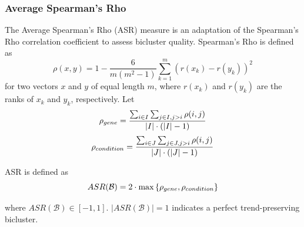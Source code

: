 \subsubsection*{Average Spearman's Rho}
The Average Spearman's Rho (ASR) \cite{ayadi2009biclustering} measure 
is an adaptation of the Spearman's Rho \cite{lehmann1975nonparametrics} correlation coefficient to assess bicluster quality. Spearman's Rho is defined as
\begin{equation}\label{spearman_rho}
	\rho(x, y) = 1 - \frac{6}{m(m^2-1)} \sum_{k=1}^{m} \left(r\left(x_k\right) - r\left(y_k\right)\right)^2
\end{equation}
for two vectors $x$ and $y$ of equal length $m$, where $r(x_k)$ and $r(y_k)$ are the ranks of $x_k$ and $y_k$, respectively. Let
\begin{equation}
	\rho_{\normalfont{gene}} = \frac{\sum_{i \in I} \sum_{j \in I, j > i} \rho(i, j)}{\lvert I \rvert \cdot \left(\lvert I \rvert - 1\right)}
\end{equation}
\begin{equation}
	\rho_{\normalfont{condition}} = \frac{\sum_{i \in J} \sum_{j \in J, j > i} \rho(i, j)}{\lvert J \rvert \cdot \left(\lvert J \rvert - 1\right)}
\end{equation}

\noindent ASR is defined as
\begin{equation} \label{asr}
	ASR(\mathcal{B}) = 2 \cdot \max\left\{\rho_{\normalfont{gene}}, \rho_{\normalfont{condition}}\right\}
\end{equation}

\noindent where $ASR(\mathcal{B}) \in \left[-1, 1\right]$.  $|ASR(\mathcal{B})| = 1$ indicates a perfect trend-preserving bicluster. 

